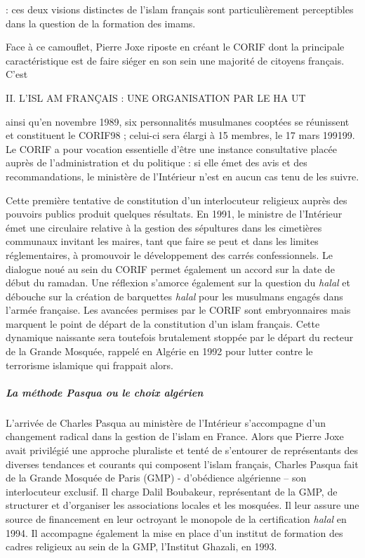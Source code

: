 : ces deux visions distinctes de l'islam français sont particulièrement
perceptibles dans la question de la formation des imams.

Face à ce camouflet, Pierre Joxe riposte en créant le CORIF dont la
principale caractéristique est de faire siéger en son sein une majorité
de citoyens français. C'est

II. L'ISL AM FRANÇAIS : UNE ORGANISATION PAR LE HA UT

ainsi qu'en novembre 1989, six personnalités musulmanes cooptées se
réunissent et constituent le CORIF98 ; celui-ci sera élargi à 15
membres, le 17 mars 199199. Le CORIF a pour vocation essentielle d'être
une instance consultative placée auprès de l'administration et du
politique : si elle émet des avis et des recommandations, le ministère
de l'Intérieur n'est en aucun cas tenu de les suivre.

Cette première tentative de constitution d'un interlocuteur religieux
auprès des pouvoirs publics produit quelques résultats. En 1991, le
ministre de l'Intérieur émet une circulaire relative à la gestion des
sépultures dans les cimetières communaux invitant les maires, tant que
faire se peut et dans les limites réglementaires, à promouvoir le
développement des carrés confessionnels. Le dialogue noué au sein du
CORIF permet également un accord sur la date de début du ramadan. Une
réflexion s'amorce également sur la question du \emph{halal} et débouche
sur la création de barquettes \emph{halal} pour les musulmans engagés
dans l'armée française. Les avancées permises par le CORIF sont
embryonnaires mais marquent le point de départ de la constitution d'un
islam français. Cette dynamique naissante sera toutefois brutalement
stoppée par le départ du recteur de la Grande Mosquée, rappelé en
Algérie en 1992 pour lutter contre le terrorisme islamique qui frappait
alors.


\hypertarget{la-muxe9thode-pasqua-ou-le-choix-alguxe9rien}{%
\subparagraph{La méthode Pasqua ou le choix
algérien}\label{la-muxe9thode-pasqua-ou-le-choix-alguxe9rien}}


L'arrivée de Charles Pasqua au ministère de l'Intérieur s'accompagne
d'un changement radical dans la gestion de l'islam en France. Alors que
Pierre Joxe avait privilégié une approche pluraliste et tenté de
s'entourer de représentants des diverses tendances et courants qui
composent l'islam français, Charles Pasqua fait de la Grande Mosquée de
Paris (GMP) - d'obédience algérienne -- son interlocuteur exclusif. Il
charge Dalil Boubakeur, représentant de la GMP, de structurer et
d'organiser les associations locales et les mosquées. Il leur assure une
source de financement en leur octroyant le monopole de la certification
\emph{halal} en 1994. Il accompagne également la mise en place d'un
institut de formation des cadres religieux au sein de la GMP, l'Institut
Ghazali, en 1993.

